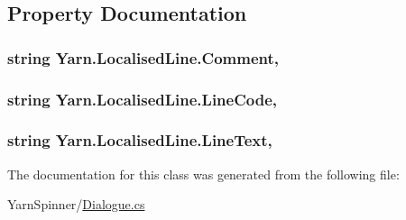\subsection{Property Documentation}
\hypertarget{a00106_afbfb834bb1623653fa73945c221c4b9d}{
\subsubsection[{Comment}]{\setlength{\rightskip}{0pt plus 5cm}string Yarn.\-Localised\-Line.\-Comment\hspace{0.3cm}{\ttfamily [get]}, {\ttfamily [set]}}}\label{a00106_afbfb834bb1623653fa73945c221c4b9d}
\hypertarget{a00106_aad88f588cbbe2df9bb83da59eeff3d3c}{
\subsubsection[{Line\-Code}]{\setlength{\rightskip}{0pt plus 5cm}string Yarn.\-Localised\-Line.\-Line\-Code\hspace{0.3cm}{\ttfamily [get]}, {\ttfamily [set]}}}\label{a00106_aad88f588cbbe2df9bb83da59eeff3d3c}
\hypertarget{a00106_ab0b4fa82cfa7693ff3c96fe5c3837fff}{
\subsubsection[{Line\-Text}]{\setlength{\rightskip}{0pt plus 5cm}string Yarn.\-Localised\-Line.\-Line\-Text\hspace{0.3cm}{\ttfamily [get]}, {\ttfamily [set]}}}\label{a00106_ab0b4fa82cfa7693ff3c96fe5c3837fff}


The documentation for this class was generated from the following file\-:\begin{DoxyCompactItemize}
\item 
Yarn\-Spinner/\hyperlink{a00262}{Dialogue.\-cs}\end{DoxyCompactItemize}
